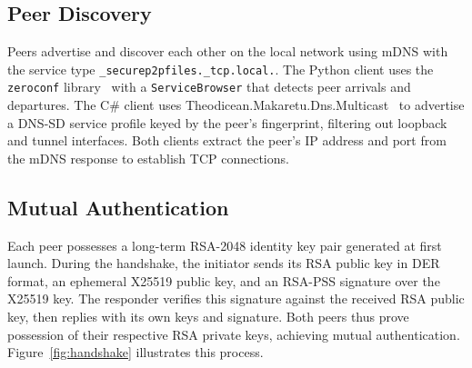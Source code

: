 \documentclass[sigconf,nonacm]{acmart}
\begin{document}
\subsection{Peer Discovery}

Peers advertise and discover each other on the local network using mDNS with the service type \texttt{\_securep2p\-files.\_tcp.local.}.
The Python client uses the \texttt{zeroconf} library~\cite{zeroconf} with a \texttt{Service\-Browser} that detects peer arrivals and departures.
The C\# client uses Theodicean.Makaretu.Dns.Multicast~\cite{Theodicean} to advertise a DNS-SD service profile keyed by the peer's fingerprint, filtering out loopback and tunnel interfaces.
Both clients extract the peer's IP address and port from the mDNS response to establish TCP connections.

\subsection{Mutual Authentication}

Each peer possesses a long-term RSA-2048 identity key pair generated at first launch.
During the handshake, the initiator sends its RSA public key in DER format, an ephemeral X25519 public key, and an RSA-PSS signature over the X25519 key.
The responder verifies this signature against the received RSA public key, then replies with its own keys and signature.
Both peers thus prove possession of their respective RSA private keys, achieving mutual authentication.
Figure~\ref{fig:handshake} illustrates this process.
\end{document}
